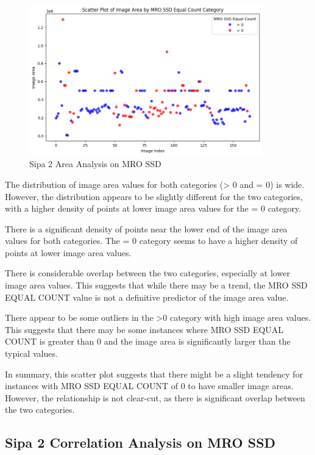 \begin{figure}[ht]
    \centering
    \includegraphics[width=0.9\textwidth]{Figures/Results/sipa_02/area.png}
    \caption[Sipa 2 Area Analysis on MRO SSD]{Sipa 2 Area Analysis on MRO SSD}
    \label{fig:Sipa 2 Area Analysis on MRO SSD}
\end{figure}


The distribution of image area values for both categories (> 0 and = 0) is wide. However, the distribution appears to be slightly different for the two categories, with a higher density of points at lower image area values for the = 0 category.

There is a significant density of points near the lower end of the image area values for both categories. The = 0 category seems to have a higher density of points at lower image area values.

There is considerable overlap between the two categories, especially at lower image area values. This suggests that while there may be a trend, the MRO SSD EQUAL COUNT value is not a definitive predictor of the image area value.

There appear to be some outliers in the >0 category with high image area values. This suggests that there may be some instances where MRO SSD EQUAL COUNT is greater than 0 and the image area is significantly larger than the typical values.

In summary, this scatter plot suggests that there might be a slight tendency for instances with MRO SSD EQUAL COUNT of 0 to have smaller image areas. However, the relationship is not clear-cut, as there is significant overlap between the two categories.



\newpage

\subsection{Sipa 2 Correlation Analysis on MRO SSD}


